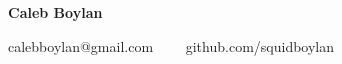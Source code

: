 \begin{center}
    {\LARGE \textbf{Caleb Boylan}}

    calebboylan@gmail.com \ \ \textbullet \ \ github.com/squidboylan
\end{center}
